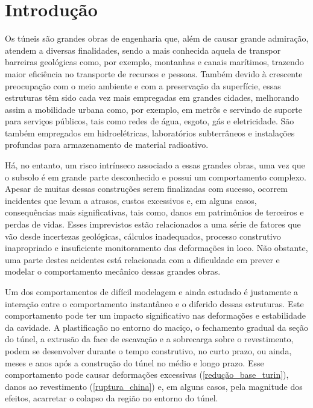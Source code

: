 \chapter{Introdução}\label{introducao}

Os túneis são grandes obras de engenharia que, além de causar grande admiração, atendem a diversas finalidades, sendo a mais conhecida aquela de transpor barreiras geológicas como, por exemplo, montanhas e canais marítimos, trazendo maior eficiência no transporte de recursos e pessoas. Também devido à crescente preocupação com o meio ambiente e com a preservação da superfície, essas estruturas têm sido cada vez mais empregadas em grandes cidades, melhorando assim a mobilidade urbana como, por exemplo, em metrôs e servindo de suporte para serviços públicos, tais como redes de água, esgoto, gás e eletricidade. São também empregados em hidroelétricas, laboratórios subterrâneos e instalações profundas para armazenamento de material radioativo.

Há, no entanto, um risco intrínseco associado a essas grandes obras, uma vez que o subsolo é em grande parte desconhecido e possui um comportamento complexo. Apesar de muitas dessas construções serem finalizadas com sucesso, ocorrem incidentes que levam a atrasos, custos excessivos e, em alguns casos, consequências mais significativas, tais como, danos em patrimônios de terceiros e perdas de vidas. Esses imprevistos estão relacionados a uma série de fatores que vão desde incertezas geológicas, cálculos inadequados, processo construtivo inapropriado e insuficiente monitoramento das deformações in loco. Não obstante, uma parte destes acidentes está relacionada com a dificuldade em prever e modelar o comportamento mecânico dessas grandes obras.

Um dos comportamentos de difícil modelagem e ainda estudado é justamente a interação entre o comportamento instantâneo e o diferido dessas estruturas. Este comportamento pode ter um impacto significativo nas deformações e estabilidade da cavidade. A plastificação no entorno do maciço, o fechamento gradual da seção do túnel, a extrusão da face de escavação e a sobrecarga sobre o revestimento, podem se desenvolver durante o tempo construtivo, no curto prazo, ou ainda, meses e anos após a construção do túnel no médio e longo prazo. Esse comportamento pode causar deformações excessivas (\autoref{redução_base_turin}), danos ao revestimento (\autoref{ruptura_china}) e, em alguns casos, pela magnitude dos efeitos, acarretar o colapso da região no entorno do túnel.

